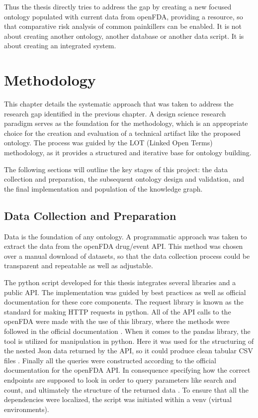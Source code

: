 Thus the thesis directly tries to address the gap by creating a new focused ontology populated with current data from openFDA, providing a resource, so that comparative risk analysis of common painkillers can be enabled. It is not about creating another ontology, another database or another data script. It is about creating an integrated system. 
\section{Methodology}
This chapter details the systematic approach that was taken to address the research gap identified in the previous chapter. A design science research paradigm serves as the foundation for the methodology, which is an appropriate choice for the creation and evaluation of a technical artifact like the proposed ontology. The process was guided by the LOT (Linked Open Terms) methodology, as it provides a structured and iterative base for ontology building.

The following sections will outline the key stages of this project: the data collection and preparation, the subsequent ontology design and validation, and the final implementation and population of the knowledge graph.
\subsection{Data Collection and Preparation}
Data is the foundation of any ontology. A programmatic approach was taken to extract the data from the openFDA drug/event API. This method was chosen over a manual download of datasets, so that the data collection process could be transparent and repeatable as well as adjustable. 

The python script developed for this thesis integrates several libraries and a public API. The implementation was guided by best practices as well as official documentation for these core components. The request library is known as the standard for making HTTP requests in python. All of the API calls to the openFDA were made with the use of this library, where the methods were followed in the official documentation \cite{requestsDocumentationHHTPForHumans}. When it comes to the pandas library, the tool is utilized for manipulation in python. Here it was used for the structuring of the nested Json data returned by the API, so it could produce clean tabular CSV files \cite{pandasDocumentation}. Finally all the queries were constructed according to the official documentation for the openFDA API. In consequence specifying how the correct endpoints are supposed to look in order to query parameters like search and count, and ultimately the structure of the returned data \cite{openFDA_API}. To ensure that all the dependencies were localized, the script was initiated within a venv (virtual environments).

